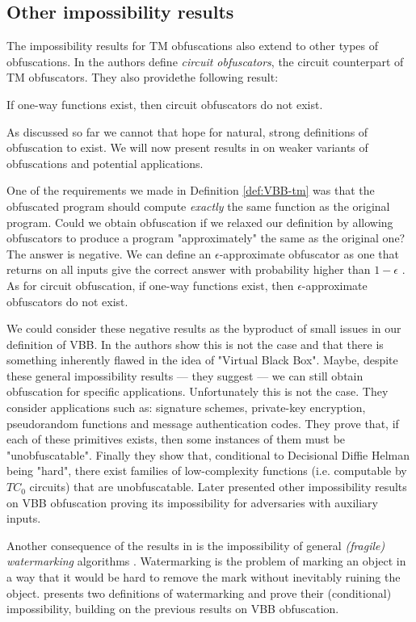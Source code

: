 \subsection{Other impossibility results}

The impossibility results for TM obfuscations also extend to other types of obfuscations.
In \cite{VBB-imp} the authors define \emph{circuit obfuscators}, the circuit counterpart of TM obfuscators. They also providethe following result:

\begin{mytheorem}
	If one-way functions exist, then circuit obfuscators do not exist.
\end{mytheorem}

As discussed so far we cannot that hope for natural, strong definitions of obfuscation to exist. We will now present results in \cite{VBB-imp} on weaker variants of obfuscations and potential applications.

One of the requirements we made in Definition \ref{def:VBB-tm} was that the obfuscated program should compute \emph{exactly} the same function as the original program. Could we obtain obfuscation if we relaxed our definition by allowing obfuscators to produce a program "approximately" the same as the original one?
The answer is negative. We can define an $\epsilon$-approximate obfuscator as one that returns on all inputs give the correct answer with probability higher than $1-\epsilon$ \cite{VBB-imp}. As for circuit obfuscation, if one-way functions exist, then $\epsilon$-approximate obfuscators do not exist.

We could consider these negative results as the byproduct of small issues in our definition of VBB. In \cite{VBB-imp} the authors show this is not the case and that there is something inherently flawed in the idea of "Virtual Black Box". Maybe, despite these general impossibility results --- they suggest --- we can still obtain obfuscation for specific applications. Unfortunately this is not the case. They consider applications such as: signature schemes, private-key encryption, pseudorandom functions and message authentication codes. They prove that, if each of these primitives exists, then some instances of them must be "unobfuscatable".
Finally they show that, conditional to Decisional Diffie Helman being "hard", there exist families of low-complexity functions (i.e. computable by $TC_0$ circuits) that are unobfuscatable.
Later \cite{VBB-imp-aux} presented other impossibility results on VBB obfuscation proving its impossibility for adversaries with auxiliary inputs.

Another consequence of the results in \cite{VBB-imp} is the impossibility of general \emph{(fragile) watermarking} algorithms \cite{collberg2002watermarking}. 
Watermarking is the problem of marking an object in a way that it would be hard to remove the mark without inevitably ruining the object. \cite{VBB-imp} presents two definitions of watermarking and prove their (conditional) impossibility, building on the previous results on VBB obfuscation.


